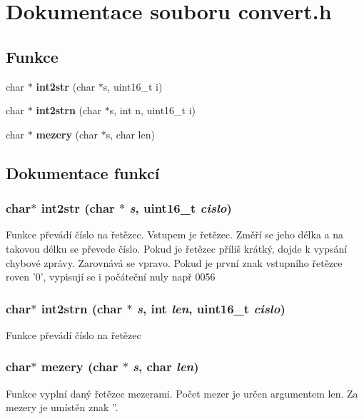 \section{Dokumentace souboru convert.h}
\label{convert_8h}
\subsection*{Funkce}
\begin{DoxyCompactItemize}
\item 
char $\ast$ {\bf int2str} (char $\ast$s, uint16\_\-t i)
\item 
char $\ast$ {\bf int2strn} (char $\ast$s, int n, uint16\_\-t i)
\item 
char $\ast$ {\bf mezery} (char $\ast$s, char len)
\end{DoxyCompactItemize}


\subsection{Dokumentace funkcí}
\subsubsection[{int2str}]{\setlength{\rightskip}{0pt plus 5cm}char$\ast$ int2str (char $\ast$ {\em s}, \/  uint16\_\-t {\em cislo})}\label{convert_8h_a74868bf442139439da976b90c8277113}
Funkce převádí číslo na řetězec. Vstupem je řetězec. Změří se jeho délka a na takovou délku se převede číslo. Pokud je řetězec příliš krátký, dojde k vypsání chybové zprávy. Zarovnává se vpravo. Pokud je první znak vstupního řetězce roven '0', vypisují se i počáteční nuly např 0056 
\subsubsection[{int2strn}]{\setlength{\rightskip}{0pt plus 5cm}char$\ast$ int2strn (char $\ast$ {\em s}, \/  int {\em len}, \/  uint16\_\-t {\em cislo})}\label{convert_8h_a0fdc20d175646f12ed735b0749ce9b01}
Funkce převádí číslo na řetězec 
\subsubsection[{mezery}]{\setlength{\rightskip}{0pt plus 5cm}char$\ast$ mezery (char $\ast$ {\em s}, \/  char {\em len})}\label{convert_8h_a39b535915350e4ef7042813898302441}
Funkce vyplní daný řetězec mezerami. Počet mezer je určen argumentem len. Za mezery je umístěn znak ''. 